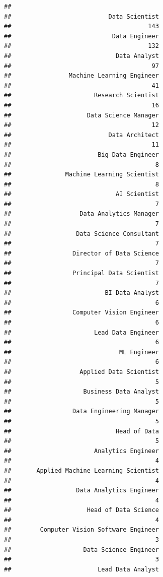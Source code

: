 \documentclass[
]{article}
\begin{document}
\begin{verbatim}
## 
##                           Data Scientist 
##                                      143 
##                            Data Engineer 
##                                      132 
##                             Data Analyst 
##                                       97 
##                Machine Learning Engineer 
##                                       41 
##                       Research Scientist 
##                                       16 
##                     Data Science Manager 
##                                       12 
##                           Data Architect 
##                                       11 
##                        Big Data Engineer 
##                                        8 
##               Machine Learning Scientist 
##                                        8 
##                             AI Scientist 
##                                        7 
##                   Data Analytics Manager 
##                                        7 
##                  Data Science Consultant 
##                                        7 
##                 Director of Data Science 
##                                        7 
##                 Principal Data Scientist 
##                                        7 
##                          BI Data Analyst 
##                                        6 
##                 Computer Vision Engineer 
##                                        6 
##                       Lead Data Engineer 
##                                        6 
##                              ML Engineer 
##                                        6 
##                   Applied Data Scientist 
##                                        5 
##                    Business Data Analyst 
##                                        5 
##                 Data Engineering Manager 
##                                        5 
##                             Head of Data 
##                                        5 
##                       Analytics Engineer 
##                                        4 
##       Applied Machine Learning Scientist 
##                                        4 
##                  Data Analytics Engineer 
##                                        4 
##                     Head of Data Science 
##                                        4 
##        Computer Vision Software Engineer 
##                                        3 
##                    Data Science Engineer 
##                                        3 
##                        Lead Data Analyst 

\end{verbatim}
\end{document}
